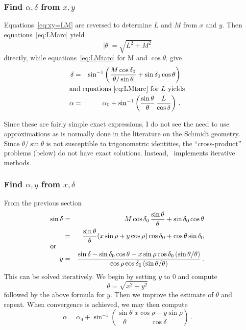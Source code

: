 \subsubsection{Find $\alpha,\delta$ from $x,y$}

Equations~\ref{eq:xy=LM} are reversed to determine $L$ and $M$ from
$x$ and $y$.  Then equations~\ref{eq:LMarc} yield
\begin{displaymath}
   | \theta | = \sqrt{L^2+M^2}
\end{displaymath}
directly, while equations~\ref{eq:LMtarc} for M and $\cos\theta$, give
\begin{eqnarray*}
  \delta & = & \sin^{-1}\left(\frac{M\cos\delta_0}{\theta/\sin\theta} +
           \sin\delta_0\cos\theta\right) \\
\noalign{\hbox{and equations~\ref{eq:LMtarc} for $L$ yields}}
   \alpha & = & \alpha_0 + \sin^{-1}\left(\frac{\sin\theta}{\theta}\,
            \frac{L}{\cos\delta}\right) \, .
\end{eqnarray*}

Since these are fairly simple exact expressions, I do not see the need
to use approximations as is normally done in the literature on the
Schmidt geometry.  Since $\theta/\sin\theta$ is not susceptible to
trigonometric identities, the ``cross-product'' problems (below) do
not have exact solutions.  Instead, \AIPS\ implements iterative
methods.

\subsubsection{Find $\alpha,y$ from $x,\delta$}

From the previous section
\begin{eqnarray*}
  \sin\delta & = &M\cos\delta_0\,\frac{\sin\theta}{\theta} +
                 \sin\delta_0\cos\theta \\
   & = &\frac{\sin\theta}{\theta} (x\sin\rho + y\cos\rho)\cos\delta_0
         + \cos\theta\sin\delta_0 \\
\noalign{\hbox{or}}
  y & = & \frac{\sin\delta-\sin\delta_0\cos\theta-x\sin\rho\cos
       \delta_0\,(\sin\theta/\theta)}{\cos\rho\cos\delta_0\,
       (\sin\theta/\theta)} \, .
\end{eqnarray*}
This can be solved iteratively.  We begin by setting $y$ to $0$ and
compute
\begin{displaymath}
  \theta = \sqrt{x^2+y^2}
\end{displaymath}
followed by the above formula for $y$.  Then we improve the estimate
of $\theta$ and repeat.  When convergence is achieved, we may then
compute
\begin{displaymath}
  \alpha = \alpha_0 + \sin^{-1}\left( \frac{\sin\theta}{\theta}\,
      \frac{x\cos\rho - y\sin\rho}{\cos\delta}\right) \, .
\end{displaymath}

